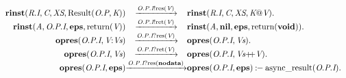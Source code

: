 \[
\begin{array}{r@{}c@{}l}
\\\Pfact{\Tstep{\Trinst{\Tr{\Tvar{R}}{\Tvar{I}}}{\Tvar{C}}{\Tvar{XS}}{\TrteResult{\To{\Tvar{O}}{\Tvar{P}}}{\Tvar{K}}}}{\Tsay{\Top{\Tvar{O}}{\Tvar{P}}{\Tvar{I}}}{\Tres{\Tvar{V}}}}{\Trinst{\Tr{\Tvar{R}}{\Tvar{I}}}{\Tvar{C}}{\Tvar{XS}}{\Tap{\Tvar{K}}{\Tvar{V}}}}}.
\\\Pfact{\Tstep{\Trinst{\Tvar{A}}{\Top{\Tvar{O}}{\Tvar{P}}{\Tvar{I}}}{\Tatom{eps}}{\Treturn{\Tvar{V}}}}{\Tsay{\Top{\Tvar{O}}{\Tvar{P}}{\Tvar{I}}}{\Tret{\Tvar{V}}}}{\Trinst{\Tvar{A}}{\Tatom{nil}}{\Tatom{eps}}{\Treturn{\Tatom{void}}}}}.
\\\Pfact{\Tstep{\Topres{\Top{\Tvar{O}}{\Tvar{P}}{\Tvar{I}}}{\Tcons{\Tvar{V}}{\Tvar{Vs}}}}{\Thear{\Top{\Tvar{O}}{\Tvar{P}}{\Tvar{I}}}{\Tres{\Tvar{V}}}}{\Topres{\Top{\Tvar{O}}{\Tvar{P}}{\Tvar{I}}}{\Tvar{Vs}}}}.
\\\Pfact{\Tstep{\Topres{\Top{\Tvar{O}}{\Tvar{P}}{\Tvar{I}}}{\Tvar{Vs}}}{\Thear{\Top{\Tvar{O}}{\Tvar{P}}{\Tvar{I}}}{\Tret{\Tvar{V}}}}{\Topres{\Top{\Tvar{O}}{\Tvar{P}}{\Tvar{I}}}{\Tseq{\Tvar{Vs}}{\Tvar{V}}}}}.
\\\Prule{\Tstep{\Topres{\Top{\Tvar{O}}{\Tvar{P}}{\Tvar{I}}}{\Tatom{eps}}}{\Thear{\Top{\Tvar{O}}{\Tvar{P}}{\Tvar{I}}}{\Tres{\Tatom{nodata}}}}{\Topres{\Top{\Tvar{O}}{\Tvar{P}}{\Tvar{I}}}{\Tatom{eps}}}}{\Tasyncresult{\Top{\Tvar{O}}{\Tvar{P}}{\Tvar{I}}}}.
\end{array}
\]
